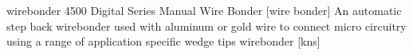 \newglsXequipment%
{wirebonder}%
{4500 Digital Series Manual Wire Bonder}%
[wire bonder]%
{An automatic step back wirebonder used with aluminum or gold wire to connect micro circuitry using a range of application specific wedge tips}%
{wirebonder}%
[kns]%